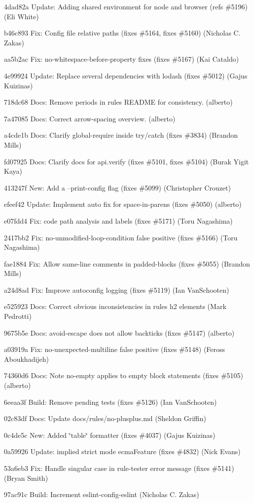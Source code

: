 \begin{DoxyItemize}
\item 4dad82a Update\+: Adding shared environment for node and browser (refs \#5196) (Eli White)
\item b46c893 Fix\+: Config file relative paths (fixes \#5164, fixes \#5160) (Nicholas C. Zakas)
\item aa5b2ac Fix\+: no-\/whitespace-\/before-\/property fixes (fixes \#5167) (Kai Cataldo)
\item 4e99924 Update\+: Replace several dependencies with lodash (fixes \#5012) (Gajus Kuizinas)
\item 718dc68 Docs\+: Remove periods in rules\textquotesingle{} R\+E\+A\+D\+ME for consistency. (alberto)
\item 7a47085 Docs\+: Correct {\ttfamily arrow-\/spacing} overview. (alberto)
\item a4cde1b Docs\+: Clarify global-\/require inside try/catch (fixes \#3834) (Brandon Mills)
\item fd07925 Docs\+: Clarify docs for api.\+verify (fixes \#5101, fixes \#5104) (Burak Yigit Kaya)
\item 413247f New\+: Add a --print-\/config flag (fixes \#5099) (Christopher Crouzet)
\item efeef42 Update\+: Implement auto fix for space-\/in-\/parens (fixes \#5050) (alberto)
\item e07fdd4 Fix\+: code path analysis and labels (fixes \#5171) (Toru Nagashima)
\item 2417bb2 Fix\+: {\ttfamily no-\/unmodified-\/loop-\/condition} false positive (fixes \#5166) (Toru Nagashima)
\item fae1884 Fix\+: Allow same-\/line comments in padded-\/blocks (fixes \#5055) (Brandon Mills)
\item a24d8ad Fix\+: Improve autoconfig logging (fixes \#5119) (Ian Van\+Schooten)
\item e525923 Docs\+: Correct obvious inconsistencies in rules h2 elements (Mark Pedrotti)
\item 9675b5e Docs\+: {\ttfamily avoid-\/escape} does not allow backticks (fixes \#5147) (alberto)
\item a03919a Fix\+: {\ttfamily no-\/unexpected-\/multiline} false positive (fixes \#5148) (Feross Aboukhadijeh)
\item 74360d6 Docs\+: Note no-\/empty applies to empty block statements (fixes \#5105) (alberto)
\item 6eeaa3f Build\+: Remove pending tests (fixes \#5126) (Ian Van\+Schooten)
\item 02c83df Docs\+: Update docs/rules/no-\/plusplus.\+md (Sheldon Griffin)
\item 0c4de5c New\+: Added \char`\"{}table\char`\"{} formatter (fixes \#4037) (Gajus Kuizinas)
\item 0a59926 Update\+: \textquotesingle{}implied strict mode\textquotesingle{} ecma\+Feature (fixes \#4832) (Nick Evans)
\item 53a6eb3 Fix\+: Handle singular case in rule-\/tester error message (fixes \#5141) (Bryan Smith)
\item 97ac91c Build\+: Increment eslint-\/config-\/eslint (Nicholas C. Zakas)
\end{DoxyItemize}

